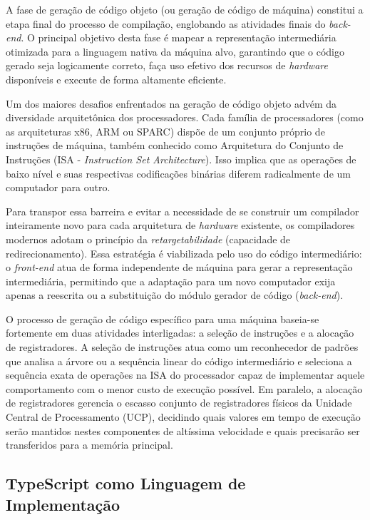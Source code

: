 A fase de geração de código objeto (ou geração de código de máquina) constitui a etapa final do processo de compilação, englobando as atividades finais do \textit{back-end}. O principal objetivo desta fase é mapear a representação intermediária otimizada para a linguagem nativa da máquina alvo, garantindo que o código gerado seja logicamente correto, faça uso efetivo dos recursos de \textit{hardware} disponíveis e execute de forma altamente eficiente.

Um dos maiores desafios enfrentados na geração de código objeto advém da diversidade arquitetônica dos processadores. Cada família de processadores (como as arquiteturas x86, ARM ou SPARC) dispõe de um conjunto próprio de instruções de máquina, também conhecido como Arquitetura do Conjunto de Instruções (ISA - \textit{Instruction Set Architecture}). Isso implica que as operações de baixo nível e suas respectivas codificações binárias diferem radicalmente de um computador para outro.

Para transpor essa barreira e evitar a necessidade de se construir um compilador inteiramente novo para cada arquitetura de \textit{hardware} existente, os compiladores modernos adotam o princípio da \textit{retargetabilidade} (capacidade de redirecionamento). Essa estratégia é viabilizada pelo uso do código intermediário: o \textit{front-end} atua de forma independente de máquina para gerar a representação intermediária, permitindo que a adaptação para um novo computador exija apenas a reescrita ou a substituição do módulo gerador de código (\textit{back-end}).

O processo de geração de código específico para uma máquina baseia-se fortemente em duas atividades interligadas: a seleção de instruções e a alocação de registradores. A seleção de instruções atua como um reconhecedor de padrões que analisa a árvore ou a sequência linear do código intermediário e seleciona a sequência exata de operações na ISA do processador capaz de implementar aquele comportamento com o menor custo de execução possível. Em paralelo, a alocação de registradores gerencia o escasso conjunto de registradores físicos da Unidade Central de Processamento (UCP), decidindo quais valores em tempo de execução serão mantidos nestes componentes de altíssima velocidade e quais precisarão ser transferidos para a memória principal.

\subsection{TypeScript como Linguagem de Implementação}

